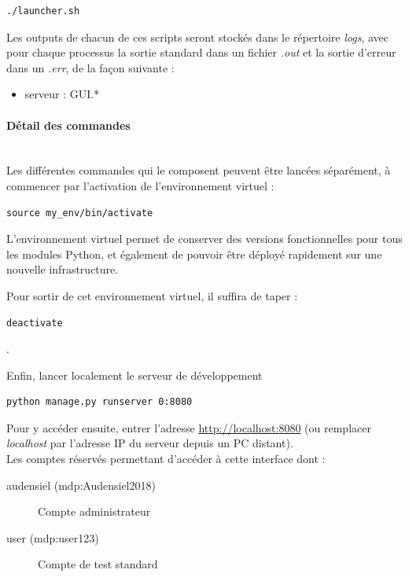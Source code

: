 \documentclass[a4paper]{report}
\begin{document}
\begin{verbatim}
./launcher.sh
\end{verbatim}


Les outputs de chacun de ces scripts seront stockés dans le répertoire \emph{logs}, avec pour chaque processus la sortie standard dans un fichier \emph{.out} et la sortie d'erreur dans un \emph{.err}, de la façon suivante :

\begin{itemize}
	\item serveur : GUI.*
\end{itemize}

\paragraph{Détail des commandes}~\\

Les différentes commandes qui le composent peuvent être lancées séparément, à commencer par l'activation de l'environnement virtuel :

\begin{verbatim}
source my_env/bin/activate
\end{verbatim}

L'environnement virtuel permet de conserver des versions fonctionnelles pour tous les modules Python, et également de pouvoir être déployé rapidement sur une nouvelle infrastructure.

Pour sortir de cet environnement virtuel, il suffira de taper : \begin{verbatim}deactivate\end{verbatim}.

Enfin, lancer localement le serveur de développement

\begin{verbatim}
python manage.py runserver 0:8080
\end{verbatim}

Pour y accéder ensuite, entrer l'adresse \href{http://localhost:8080}{http://localhost:8080} (ou remplacer \emph{localhost} par l'adresse IP du serveur depuis un PC distant).\\


Les comptes réservés permettant d'accéder à cette interface dont :

\begin{description}
	\item[audensiel (mdp:Audensiel2018)] Compte administrateur
	\item[user (mdp:user123)] Compte de test standard
\end{description}
\end{document}
